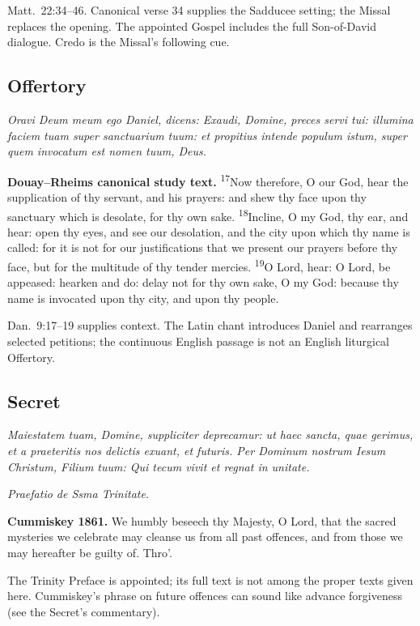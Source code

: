 Matt.~22:34--46. Canonical verse 34 supplies the Sadducee setting; the Missal replaces the opening. The appointed Gospel includes the full Son-of-David dialogue. Credo is the Missal’s following cue.

\subsection{Offertory}\label{proper-offertory}

\textit{Oravi Deum meum ego Daniel, dicens: Exaudi, Domine, preces servi tui: illumina faciem tuam super sanctuarium tuum: et propitius intende populum istum, super quem invocatum est nomen tuum, Deus.}

\textbf{Douay--Rheims canonical study text.} \textsuperscript{17}Now therefore, O our God, hear the supplication of thy servant, and his prayers: and shew thy face upon thy sanctuary which is desolate, for thy own sake. \textsuperscript{18}Incline, O my God, thy ear, and hear: open thy eyes, and see our desolation, and the city upon which thy name is called: for it is not for our justifications that we present our prayers before thy face, but for the multitude of thy tender mercies. \textsuperscript{19}O Lord, hear: O Lord, be appeased: hearken and do: delay not for thy own sake, O my God: because thy name is invocated upon thy city, and upon thy people.

Dan.~9:17--19 supplies context. The Latin chant introduces Daniel and rearranges selected petitions; the continuous English passage is not an English liturgical Offertory.

\subsection{Secret}\label{proper-secret}

\textit{Maiestatem tuam, Domine, suppliciter deprecamur: ut haec sancta, quae gerimus, et a praeteritis nos delictis exuant, et futuris. Per Dominum nostrum Iesum Christum, Filium tuum: Qui tecum vivit et regnat in unitate.}

\textit{Praefatio de Ssma Trinitate.}

\textbf{Cummiskey 1861.} We humbly beseech thy Majesty, O Lord, that the sacred mysteries we celebrate may cleanse us from all past offences, and from those we may hereafter be guilty of. Thro’.

The Trinity Preface is appointed; its full text is not among the proper texts given here. Cummiskey's phrase on future offences can sound like advance forgiveness (see the Secret's commentary).

